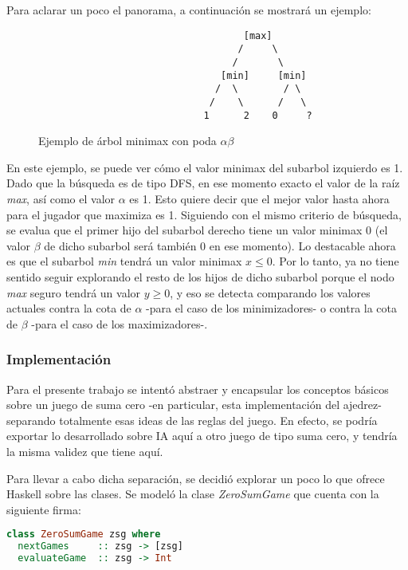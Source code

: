 \documentclass{llncs}
\begin{document}
Para aclarar un poco el panorama, a continuación se mostrará un ejemplo:

\begin{figure}
\begin{verbatim}
                                    [max]
                                   /     \
                                  /       \
                                [min]     [min]
                               /  \        / \
                              /    \      /   \
                             1      2    0     ?
\end{verbatim}
\caption{Ejemplo de árbol minimax con poda $\alpha\beta$}
\label{fig:ascii-box}
\end{figure}

En este ejemplo, se puede ver cómo el valor minimax del subarbol izquierdo es 1. Dado que la búsqueda es de tipo DFS, en ese momento exacto el valor de la raíz \textit{max}, así como el valor $\alpha$ es 1. Esto quiere decir que el mejor valor hasta ahora para el jugador que maximiza es 1. Siguiendo con el mismo criterio de búsqueda, se evalua que el primer hijo del subarbol derecho tiene un valor minimax 0 (el valor $\beta$ de dicho subarbol será también 0 en ese momento). Lo destacable ahora es que el subarbol \textit{min} tendrá un valor minimax $x \leq 0$. Por lo tanto, ya no tiene sentido seguir explorando el resto de los hijos de dicho subarbol porque el nodo \textit{max} seguro tendrá un valor $y \geq 0$, y eso se detecta comparando los valores actuales contra la cota de $\alpha$ -para el caso de los minimizadores- o contra la cota de $\beta$ -para el caso de los maximizadores-.

\subsubsection{ Implementación }

Para el presente trabajo se intentó abstraer y encapsular los conceptos básicos sobre un juego de suma cero -en particular, esta implementación del ajedrez- separando totalmente esas ideas de las reglas del juego. En efecto, se podría exportar lo desarrollado sobre IA aquí a otro juego de tipo suma cero, y tendría la misma validez que tiene aquí.

Para llevar a cabo dicha separación, se decidió explorar un poco lo que ofrece Haskell sobre las clases. Se modeló la clase \textit{ZeroSumGame} que cuenta con la siguiente firma:

\begin{lstlisting}[frame=single, language=haskell, captionpos=b, caption=Definición de la clase ZeroSumGame, label={lst:zero_sum_game_def}]
class ZeroSumGame zsg where
  nextGames     :: zsg -> [zsg]
  evaluateGame  :: zsg -> Int
\end{lstlisting}
\end{document}
